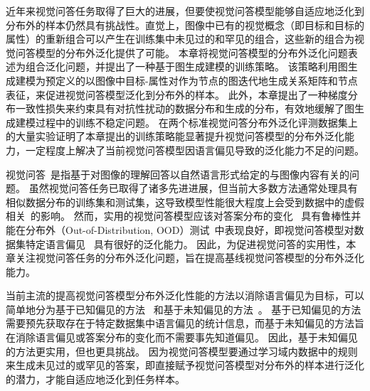 
近年来视觉问答任务取得了巨大的进展，但要使视觉问答模型能够自适应地泛化到分布外的样本仍然具有挑战性。直觉上，图像中已有的视觉概念（即目标和目标的属性）的重新组合可以产生在训练集中未见过的和罕见的组合，这些新的组合为视觉问答模型的分布外泛化提供了可能。
本章将视觉问答模型的分布外泛化问题表述为组合泛化问题，并提出了一种基于图生成建模的训练策略。
该策略利用图生成建模为预定义的以图像中目标-属性对作为节点的图迭代地生成关系矩阵和节点表征，来促进视觉问答模型泛化到分布外的样本。
此外，本章提出了一种梯度分布一致性损失来约束具有对抗性扰动的数据分布和生成的分布，有效地缓解了图生成建模过程中的训练不稳定问题。
在两个标准视觉问答分布外泛化评测数据集上的大量实验证明了本章提出的训练策略能显著提升视觉问答模型的分布外泛化能力，一定程度上解决了当前视觉问答模型因语言偏见导致的泛化能力不足的问题。




视觉问答~\cite{antol2015vqa}是指基于对图像的理解回答以自然语言形式给定的与图像内容有关的问题。
虽然视觉问答任务已取得了诸多先进进展，但当前大多数方法通常处理具有相似数据分布的训练集和测试集，这导致模型性能很大程度上会受到数据中的虚假相关~\cite{zhang2016yin,agrawal2016analyzing,goyal2017making,agrawal2018don}的影响。
然而，实用的视觉问答模型应该对答案分布的变化~\cite{kervadec2021roses} 具有鲁棒性并能在分布外（Out-of-Distribution, OOD）测试~\cite{teney2020value}中表现良好，即视觉问答模型对数据集特定语言偏见~\cite{agrawal2016analyzing,zhang2016yin,goyal2017making,agrawal2018don} 具有很好的泛化能力。
因此，为促进视觉问答的实用性，本章关注视觉问答任务的分布外泛化问题，旨在提高基线视觉问答模型的分布外泛化能力。

当前主流的提高视觉问答模型分布外泛化性能的方法以消除语言偏见为目标，可以简单地分为基于已知偏见的方法~\cite{clark2019don,chen2020counterfactual,liang2020learning} 和基于未知偏见的方法~\cite{teney2020unshuffling,gokhale2020mutant,clark2020learning}。
基于已知偏见的方法需要预先获取存在于特定数据集中语言偏见的统计信息，而基于未知偏见的方法旨在消除语言偏见或答案分布的变化而不需要事先知道偏见。
因此，基于未知偏见的方法更实用，但也更具挑战。
因为视觉问答模型要通过学习域内数据中的规则来生成未见过的或罕见的答案，即直接赋予视觉问答模型对分布外的样本进行泛化的潜力，才能自适应地泛化到任务样本。


